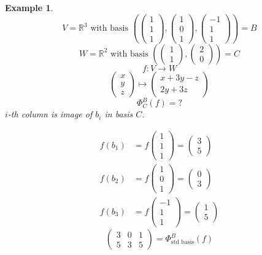 \documentclass[a4paper,landscape,twocolumn]{article}
\newtheorem{ex}{Example}
\begin{document}
\begin{ex}
  \label{ex-6.55}
  \[
    V = \mathbb R^3 \text{ with basis } \left(
      \begin{pmatrix} 1 \\ 1 \\ 1 \end{pmatrix},
      \begin{pmatrix} 1 \\ 0 \\ 1 \end{pmatrix},
      \begin{pmatrix} -1 \\ 1 \\ 1 \end{pmatrix}
    \right) = B
  \] \[
    W = \mathbb R^2 \text{ with basis } \left(
      \begin{pmatrix} 1 \\ 1 \end{pmatrix},
      \begin{pmatrix} 2 \\ 0 \end{pmatrix}
    \right) = C
  \] \[
    f: V \to W
  \] \[
    \begin{pmatrix} x \\ y \\ z \end{pmatrix}
    \mapsto
    \begin{pmatrix}
      x + 3y - z \\
      2y + 3z
    \end{pmatrix}
  \] \[
    \Phi_C^B(f) = \text{?}
  \]
  $i$-th column is image of $b_i$ in basis $C$.

  \begin{align*}
    f(b_1) &= f\begin{pmatrix} 1 \\ 1 \\ 1 \end{pmatrix} = \begin{pmatrix} 3 \\ 5 \end{pmatrix} \\
    f(b_2) &= f\begin{pmatrix} 1 \\ 0 \\ 1 \end{pmatrix} = \begin{pmatrix} 0 \\ 3 \end{pmatrix} \\
    f(b_3) &= f\begin{pmatrix} -1 \\ 1 \\ 1 \end{pmatrix} = \begin{pmatrix} 1 \\ 5 \end{pmatrix}
  \end{align*}
  \[
    \begin{pmatrix}
      3 & 0 & 1 \\
      5 & 3 & 5
    \end{pmatrix}
    = \Phi_{\text{std basis}}^B(f)
  \]


\end{ex}
\end{document}
